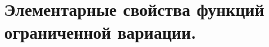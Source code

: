 \documentclass[../main.tex]{subfiles}
\begin{document}
\newpage
\section{Элементарные свойства функций ограниченной вариации.}
\end{document}
